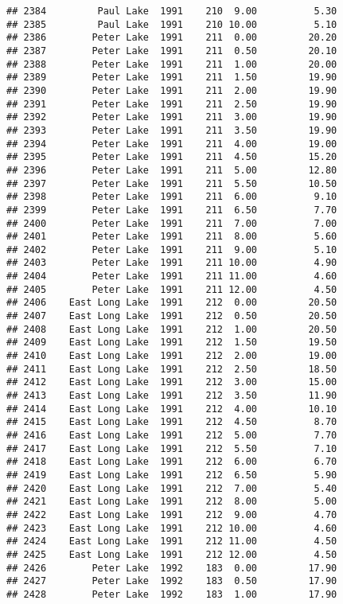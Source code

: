 \documentclass[
]{article}
\begin{document}
\begin{verbatim}
## 2384         Paul Lake  1991    210  9.00          5.30
## 2385         Paul Lake  1991    210 10.00          5.10
## 2386        Peter Lake  1991    211  0.00         20.20
## 2387        Peter Lake  1991    211  0.50         20.10
## 2388        Peter Lake  1991    211  1.00         20.00
## 2389        Peter Lake  1991    211  1.50         19.90
## 2390        Peter Lake  1991    211  2.00         19.90
## 2391        Peter Lake  1991    211  2.50         19.90
## 2392        Peter Lake  1991    211  3.00         19.90
## 2393        Peter Lake  1991    211  3.50         19.90
## 2394        Peter Lake  1991    211  4.00         19.00
## 2395        Peter Lake  1991    211  4.50         15.20
## 2396        Peter Lake  1991    211  5.00         12.80
## 2397        Peter Lake  1991    211  5.50         10.50
## 2398        Peter Lake  1991    211  6.00          9.10
## 2399        Peter Lake  1991    211  6.50          7.70
## 2400        Peter Lake  1991    211  7.00          7.00
## 2401        Peter Lake  1991    211  8.00          5.60
## 2402        Peter Lake  1991    211  9.00          5.10
## 2403        Peter Lake  1991    211 10.00          4.90
## 2404        Peter Lake  1991    211 11.00          4.60
## 2405        Peter Lake  1991    211 12.00          4.50
## 2406    East Long Lake  1991    212  0.00         20.50
## 2407    East Long Lake  1991    212  0.50         20.50
## 2408    East Long Lake  1991    212  1.00         20.50
## 2409    East Long Lake  1991    212  1.50         19.50
## 2410    East Long Lake  1991    212  2.00         19.00
## 2411    East Long Lake  1991    212  2.50         18.50
## 2412    East Long Lake  1991    212  3.00         15.00
## 2413    East Long Lake  1991    212  3.50         11.90
## 2414    East Long Lake  1991    212  4.00         10.10
## 2415    East Long Lake  1991    212  4.50          8.70
## 2416    East Long Lake  1991    212  5.00          7.70
## 2417    East Long Lake  1991    212  5.50          7.10
## 2418    East Long Lake  1991    212  6.00          6.70
## 2419    East Long Lake  1991    212  6.50          5.90
## 2420    East Long Lake  1991    212  7.00          5.40
## 2421    East Long Lake  1991    212  8.00          5.00
## 2422    East Long Lake  1991    212  9.00          4.70
## 2423    East Long Lake  1991    212 10.00          4.60
## 2424    East Long Lake  1991    212 11.00          4.50
## 2425    East Long Lake  1991    212 12.00          4.50
## 2426        Peter Lake  1992    183  0.00         17.90
## 2427        Peter Lake  1992    183  0.50         17.90
## 2428        Peter Lake  1992    183  1.00         17.90

\end{verbatim}
\end{document}
